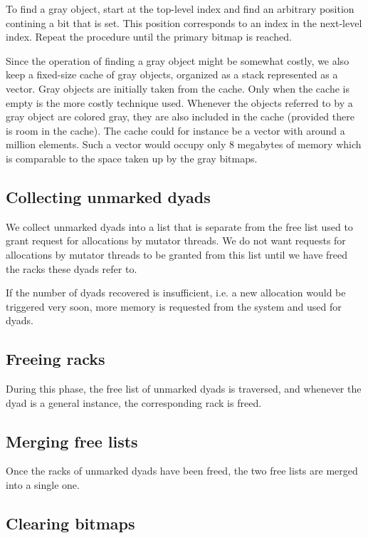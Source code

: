 To find a gray object, start at the top-level index and find an
arbitrary position contining a bit that is set.  This position
corresponds to an index in the next-level index.  Repeat the procedure
until the primary bitmap is reached.

Since the operation of finding a gray object might be somewhat costly,
we also keep a fixed-size cache of gray objects, organized as a stack
represented as a vector.  Gray objects are initially taken from the
cache.  Only when the cache is empty is the more costly technique
used.  Whenever the objects referred to by a gray object are colored
gray, they are also included in the cache (provided there is room in
the cache).  The cache could for instance be a vector with around a
million elements.  Such a vector would occupy only 8 megabytes of
memory which is comparable to the space taken up by the gray bitmaps.

\subsection{Collecting unmarked dyads}

We collect unmarked dyads into a list that is separate from the free
list used to grant request for allocations by mutator threads.  We do
not want requests for allocations by mutator threads to be granted
from this list until we have freed the racks these dyads refer to.

If the number of dyads recovered is insufficient, i.e. a new
allocation would be triggered very soon, more memory is requested from
the system and used for dyads.

\subsection{Freeing racks}

During this phase, the free list of unmarked dyads is traversed, and
whenever the dyad is a general instance, the corresponding rack is
freed.

\subsection{Merging free lists}

Once the racks of unmarked dyads have been freed, the two free lists
are merged into a single one.

\subsection{Clearing bitmaps}

